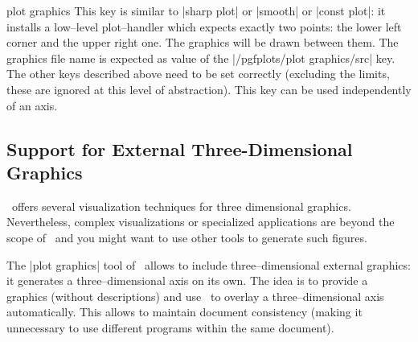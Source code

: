 {{\begin{pgfplotskey}{plot graphics}
	This key is similar to |sharp plot| or |smooth| or |const plot|: it installs a low--level plot--handler which expects exactly two points: the lower left corner and the upper right one. The graphics will be drawn between them. The graphics file name is expected as value of the |/pgfplots/plot graphics/src| key. The other keys described above need to be set correctly (excluding the limits, these are ignored at this level of abstraction). This key can be used independently of an axis.
\end{pgfplotskey}

	
\subsection*{Support for External Three-Dimensional Graphics}
\label{sec:plotgraphics3d}
\PGFPlots\ offers several visualization techniques for three dimensional graphics. Nevertheless, complex visualizations or specialized applications are beyond the scope of \PGFPlots\ and you might want to use other tools to generate such figures. 

The |plot graphics| tool of \PGFPlots\ allows to include three--dimensional external graphics: it generates a three--dimensional axis on its own. The idea is to provide a graphics (without descriptions) and use \PGFPlots\ to overlay a three--dimensional axis automatically. This allows to maintain document consistency (making it unnecessary to use different programs within the same document). 

}}
